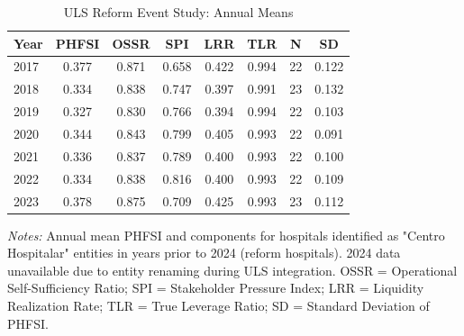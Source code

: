 \documentclass[12pt,oneside]{article}
\begin{document}
\begin{table}[htbp]
\centering
\caption{ULS Reform Event Study: Annual Means}
\label{tab:uls_summary}
\footnotesize
\begin{threeparttable}
\begin{tabular}{lccccccc}
\toprule
Year & PHFSI & OSSR & SPI & LRR & TLR & N & SD \\
\midrule
2017 & 0.377 & 0.871 & 0.658 & 0.422 & 0.994 & 22 & 0.122 \\
2018 & 0.334 & 0.838 & 0.747 & 0.397 & 0.991 & 23 & 0.132 \\
2019 & 0.327 & 0.830 & 0.766 & 0.394 & 0.994 & 22 & 0.103 \\
2020 & 0.344 & 0.843 & 0.799 & 0.405 & 0.993 & 22 & 0.091 \\
2021 & 0.336 & 0.837 & 0.789 & 0.400 & 0.993 & 22 & 0.100 \\
2022 & 0.334 & 0.838 & 0.816 & 0.400 & 0.993 & 22 & 0.109 \\
2023 & 0.378 & 0.875 & 0.709 & 0.425 & 0.993 & 23 & 0.112 \\
\bottomrule
\end{tabular}
\begin{tablenotes}
\small
\item \textit{Notes:} Annual mean PHFSI and components for hospitals identified as "Centro Hospitalar" entities in years prior to 2024 (reform hospitals). 2024 data unavailable due to entity renaming during ULS integration. OSSR = Operational Self-Sufficiency Ratio; SPI = Stakeholder Pressure Index; LRR = Liquidity Realization Rate; TLR = True Leverage Ratio; SD = Standard Deviation of PHFSI.
\end{tablenotes}
\end{threeparttable}
\end{table}
\end{document}
